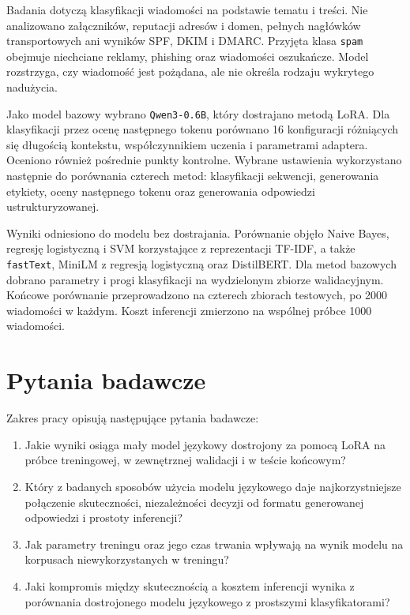 Badania dotyczą klasyfikacji wiadomości na podstawie tematu i treści. Nie
analizowano załączników, reputacji adresów i domen, pełnych nagłówków
transportowych ani wyników SPF, DKIM i DMARC. Przyjęta klasa \texttt{spam}
obejmuje niechciane reklamy, phishing oraz wiadomości oszukańcze. Model
rozstrzyga, czy wiadomość jest pożądana, ale nie określa rodzaju wykrytego
nadużycia.

Jako model bazowy wybrano \texttt{Qwen3-0.6B}, który dostrajano metodą LoRA.
Dla klasyfikacji przez ocenę następnego tokenu porównano 16 konfiguracji
różniących się długością kontekstu, współczynnikiem uczenia i parametrami
adaptera. Oceniono również pośrednie punkty kontrolne. Wybrane ustawienia
wykorzystano następnie do porównania czterech metod: klasyfikacji sekwencji,
generowania etykiety, oceny następnego tokenu oraz generowania odpowiedzi
ustrukturyzowanej.

Wyniki odniesiono do modelu bez dostrajania. Porównanie objęło Naive Bayes,
regresję logistyczną i SVM korzystające z reprezentacji TF-IDF, a także
\texttt{fastText}, MiniLM z regresją logistyczną oraz DistilBERT. Dla metod
bazowych dobrano parametry i progi klasyfikacji na wydzielonym zbiorze
walidacyjnym. Końcowe porównanie przeprowadzono na czterech zbiorach testowych,
po 2000 wiadomości w każdym. Koszt inferencji zmierzono na wspólnej próbce 1000
wiadomości.

\section{Pytania badawcze}

Zakres pracy opisują następujące pytania badawcze:

\begin{enumerate}
    \item Jakie wyniki osiąga mały model językowy dostrojony za pomocą LoRA na
    próbce treningowej, w zewnętrznej walidacji i w teście końcowym?
    \item Który z badanych sposobów użycia modelu językowego daje
    najkorzystniejsze połączenie skuteczności, niezależności decyzji od formatu
    generowanej odpowiedzi i prostoty inferencji?
    \item Jak parametry treningu oraz jego czas trwania wpływają na wynik
    modelu na korpusach niewykorzystanych w treningu?
    \item Jaki kompromis między skutecznością a kosztem inferencji wynika z
    porównania dostrojonego modelu językowego z prostszymi klasyfikatorami?
\end{enumerate}

